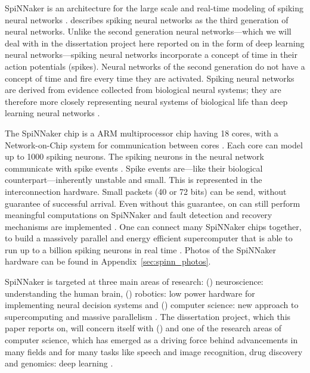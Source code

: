 \documentclass{article}
\begin{document}
SpiNNaker is an architecture for the large scale and
real-time modeling of spiking neural networks
\citep{furber_et_al_2006, furber_et_al_2006b,
  furber_et_al_2007}.
\citet{maass1997} describes spiking neural networks as the
third generation of neural networks.
Unlike the second generation neural networks---which we
will deal with in the dissertation project here reported on
in the form of deep learning neural networks---spiking
neural networks incorporate a concept of time in their
action potentials (spikes).
Neural networks of the second generation do not have a
concept of time and fire every time they are activated.
Spiking neural networks are derived from evidence
collected from biological neural systems; they are
therefore more closely representing neural systems of
biological life than deep learning neural networks
\citep{maass1997}.

The SpiNNaker chip is a ARM multiprocessor chip having 18
cores, with a Network-on-Chip system for
communication between cores \citep{furber_et_al_2007,
  spinn_proj}.
Each core can model up to 1000 spiking neurons.
The spiking neurons in the neural network communicate with
spike events \citep{furber_et_al_2007}.
Spike events are---like their biological
counterpart---inherently unstable and small.
This is represented in the interconnection hardware.
Small packets (40 or 72 bits) can be send, without
guarantee of successful arrival.
Even without this guarantee, on can still perform
meaningful computations on SpiNNaker and fault detection
and recovery mechanisms are implemented \citep{spinn_proj}.
One can connect many SpiNNaker chips together, to build a
massively parallel and energy efficient supercomputer that
is able to run up to a billion spiking neurons in real time
\citep{furber_et_al_2007}.
Photos of the SpiNNaker hardware can be found in
Appendix~\ref{sec:spinn_photos}.

SpiNNaker is targeted at three main areas of research:
() neuroscience: understanding the human
brain, () robotics: low power hardware for
implementing neural decision systems and
() computer science: new approach to
supercomputing and massive parallelism \citep{spinn_proj}.
The dissertation project, which this paper reports on,
will concern itself with () and one of the
research areas of computer science, which has emerged as
a driving force behind advancements in many fields and for
many tasks like speech and image recognition, drug
discovery and genomics: deep learning
\citep{lecun_et_al_2015}.
\end{document}
